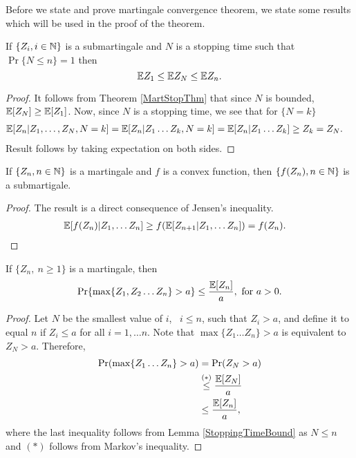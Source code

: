 \documentclass[a4paper,10pt,english]{article}
\begin{document}
Before we state and prove martingale convergence theorem, we state some results which will be used in the proof of the theorem.
\begin{lem}
\label{StoppingTimeBound}
If $\{Z_i, i \in \mathbb{N} \}$ is  a submartingale and $N$ is a stopping time such that $\Pr\{N \leq n\}=1$ then
\begin{equation*}
 \mathbb{E} Z_1 \leq \mathbb{E} Z_N \leq \mathbb{E} Z_n.
\end{equation*}
\end{lem}
\begin{proof}
It follows from Theorem \ref{MartStopThm} that since $N$ is bounded, $\mathbb{E}[Z_N] \geq \mathbb{E}[Z_1]$. Now, since $N$ is a stopping time, we see that for $\{N = k\}$
\begin{eqnarray*}
\mathbb{E}[Z_n|Z_1, \hdots ,Z_N,N=k]&=\mathbb{E}[Z_n|Z_1 \hdots Z_k,N=k] = \mathbb{E}[Z_n|Z_1 \hdots Z_k] \geq Z_k = Z_N.
\end{eqnarray*}
Result follows by taking expectation on both sides.
\end{proof}
\begin{lem}
\label{ConvexFuncSubmart}
If $\{Z_n,n \in \mathbb{N}\}$ is a martingale and $f$ is a convex function, then $\{f(Z_n),n \in \mathbb{N}\}$ is a submartigale.
\end{lem}
\begin{proof}
The result is a direct consequence of Jensen's inequality.
\begin{align*}
\mathbb{E}[f(Z_n)|Z_1, \hdots Z_n] &\geq f(\mathbb{E}[Z_{n+1}|Z_1, \hdots Z_n])=f(Z_n).
\end{align*}
\end{proof}
\begin{thm} If $\{Z_n,~ n \geq 1\}$ is a martingale, then
\begin{equation*}
\Pr\{\max\{Z_1,Z_2 \hdots Z_n\}>a\}\leq \frac{\mathbb{E}[Z_n]}{a},~ \text{for}~ a>0.
\end{equation*}
\end{thm}
\begin{proof}
Let $N$ be the smallest value of $i$,~ $i \leq n$, such that $Z_i >a$, and define it to equal $n$ if $Z_i \leq a$ for all $i=1, \hdots n$. Note that $\max\{Z_1 \hdots Z_n\}>a$ is equivalent to $Z_N>a$. Therefore,
\begin{eqnarray*}
\Pr(\max\{Z_1 \hdots Z_n\}>a)&=\Pr(Z_N>a)\\
&\stackrel{(*)}{\leq} \frac{\mathbb{E}[Z_N]}{a}\\
&\leq  \frac{\mathbb{E}[Z_n]}{a},
\end{eqnarray*}
where the last inequality follows from Lemma \ref{StoppingTimeBound} as $N \leq n$ and $(*)$ follows from Markov's inequality.
\end{proof}
\end{document}
